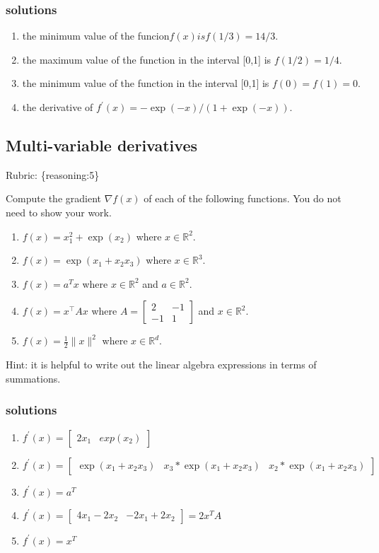 \documentclass{article}
\def\rubric#1{\gre{Rubric: \{#1\}}}{}
\def\blu#1{{\color{blu}#1}}
\def\gre#1{{\color{gre}#1}}
\def\red#1{{\color{red}#1}}
\def\norm#1{\|#1\|}
\def\R{\mathbb{R}}
\def\enum#1{\begin{enumerate}#1\end{enumerate}}
\begin{document}
\subsubsection{solutions}
\enum{
\item the minimum value of the funcion$ f(x)  is f(1/3) = 14/3$.
\item the maximum value of the function in the interval [0,1] is $f(1/2) = 1/4$.
\item the minimum value of the function in the interval [0,1] is $f(0) = f(1) = 0$.
\item the derivative of $f^{'}(x) = -\exp(-x)/(1 + \exp(-x)) $.
}
\subsection{Multi-variable derivatives}
\rubric{reasoning:5}

\blu{Compute the gradient $\nabla f(x)$ of each of the following functions.} \red{You do not need to show your work.}
\begin{enumerate}
\item $f(x) = x_1^2 + \exp(x_2)$ where $x \in \R^2$.
\item $f(x) = \exp(x_1 + x_2x_3)$ where $x \in \mathbb{R}^3$.
\item $f(x) = a^Tx$ where $x \in \R^2$ and $a \in \R^2$.
\item $f(x) = x^\top A x$ where $A=\left[ \begin{array}{cc}
2 & -1 \\
 -1 & 1 \end{array} \right]$ and $x \in \mathbb{R}^2$.
 \item $f(x) = \frac{1}{2}\norm{x}^2$ where $x \in \R^d$.
\end{enumerate}

Hint: it is helpful to write out the linear algebra expressions in terms of summations.

\subsubsection{solutions}
\enum{
\item $ f^{'}(x) = \left[\begin{array}{cc}
2x_1 & exp(x_2)
\end{array}\right]$
\item $ f^{'}(x) = \left[\begin{array}{ccc}
\exp(x_1 + x_2 x_3) & x_3 *\exp(x_1 + x_2 x_3) & x_2*\exp(x_1 + x_2 x_3)
\end{array}\right]$
\item $ f ^{'}(x) = a^T $
\item $ f^{'}(x) = \left[\begin{array}{cc}
4x_1 - 2x_2 & -2x_1 + 2x_2
\end{array}\right] = 2x^TA$
\item $ f^{'}(x) = x^T$
}
\end{document}
